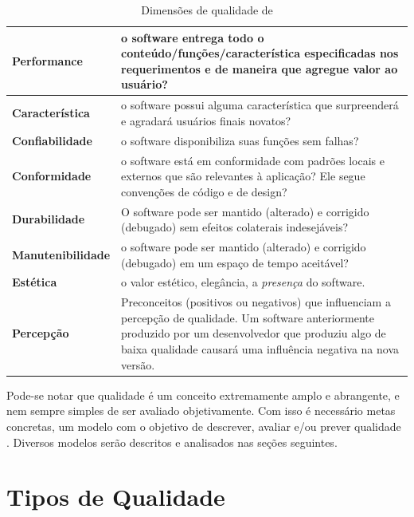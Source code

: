 \documentclass[
	12pt,				%
	openright,			%
	twoside,			%
	a4paper,			%
	english,			%
	brazil,				%
	]{abntex2}
\begin{document}
\begin{table}[h]
    \caption{Dimensões de qualidade de }
    \label{tab:qualidade_garvin}
    \begin{tabular}{p{3.7cm}|p{11cm}}
        \textbf{Performance} & o software entrega todo o conteúdo/funções/característica especificadas nos requerimentos e de maneira que agregue valor ao usuário? \\ \hline
        \textbf{Característica} & o software possui alguma característica que surpreenderá e agradará usuários finais novatos? \\ \hline
        \textbf{Confiabilidade} & o software disponibiliza suas funções sem falhas? \\ \hline
        \textbf{Conformidade} & o software está em conformidade com padrões locais e externos que são relevantes à aplicação? Ele segue convenções de código e de design? \\ \hline
        \textbf{Durabilidade} & O software pode ser mantido (alterado) e corrigido (debugado) sem efeitos colaterais indesejáveis? \\ \hline
        \textbf{Manutenibilidade} & o software pode ser mantido (alterado) e corrigido (debugado) em um espaço de tempo aceitável? \\ \hline
        \textbf{Estética} & o valor estético, elegância, a \emph{presença} do software.\\ \hline
        \textbf{Percepção} & Preconceitos (positivos ou negativos) que influenciam a percepção de qualidade. Um software anteriormente produzido por um desenvolvedor que produziu algo de baixa qualidade causará uma influência negativa na nova versão.\\
  \end{tabular}
\end{table}

Pode-se notar que qualidade é um conceito extremamente amplo e abrangente, e nem sempre simples de ser avaliado objetivamente. Com isso é necessário metas concretas, um modelo com o objetivo de descrever, avaliar e/ou prever qualidade \cite{wagner2013}. Diversos modelos serão descritos e analisados nas seções seguintes.

\section{Tipos de Qualidade}
\end{document}
